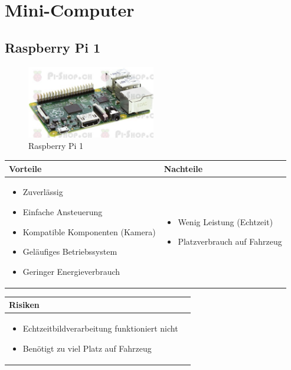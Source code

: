 
\section{Mini-Computer}


\subsection{Raspberry Pi 1}

\begin{figure}[h!]%
\centering
\includegraphics[width=0.5\textwidth]{fig/PI1.jpg}
\caption{Raspberry Pi 1}
\label{fig:PI1}
\end{figure}

\begin{table}[h]
\begin{tabular}{p{} | p{}}


 \textbf{Vorteile} & \textbf{Nachteile} \\ \hline
	 
\begin{itemize}
\item Zuverlässig
\item Einfache Ansteuerung
\item Kompatible Komponenten (Kamera)
\item Geläufiges Betriebssystem
\item Geringer Energieverbrauch
\end{itemize}

 
 &
 
\begin{itemize}
\item Wenig Leistung (Echtzeit)
\item Platzverbrauch auf Fahrzeug
\end{itemize}

\end{tabular}
\end{table}

\begin{table}[h]
\begin{tabular}{p{}p{}}


 \textbf{Risiken} & \\ \hline
	 
\begin{itemize}
\item Echtzeitbildverarbeitung funktioniert nicht
\item Benötigt zu viel Platz auf Fahrzeug
\end{itemize}

 
\end{tabular}
\end{table}

